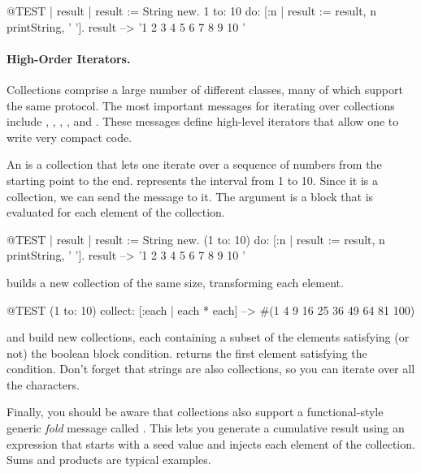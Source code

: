 \documentclass[a4paper,10pt,twoside]{book}
\begin{document}
\begin{code}{@TEST | result |}
result := String new.
1 to: 10 do: [:n | result := result, n printString, ' '].
result --> '1 2 3 4 5 6 7 8 9 10 '
\end{code}

\paragraph{High-Order Iterators.}
Collections comprise a large number of different classes, many of which support the same protocol.
The most important messages for iterating over collections include
, , , ,  and .
These messages define high-level iterators that allow one to write very compact code.

An  is a collection that lets one iterate over a sequence of numbers from the starting point to the end.
 represents the interval from 1 to 10.
Since it is a collection, we can send the message  to it.
The argument is a block that is evaluated for each element of the collection.

\begin{code}{@TEST | result |}
result := String new.
(1 to: 10) do: [:n | result := result, n printString, ' '].
result --> '1 2 3 4 5 6 7 8 9 10 '
\end{code}

 builds a new collection of the same size, transforming each element.
\begin{code}{@TEST}
(1 to: 10) collect: [:each | each * each] --> #(1 4 9 16 25 36 49 64 81 100)
\end{code}

 and  build new collections, each containing a subset of the elements satisfying (or not) the boolean block condition.
 returns the first element satisfying the condition.
Don't forget that strings are also collections, so you can iterate over all the characters.


Finally, you should be aware that collections also support a functional-style generic \emph{fold} message called .
This lets you generate a cumulative result using an expression that starts with a seed value and injects each element of the collection.
Sums and products are typical examples.
\end{document}
